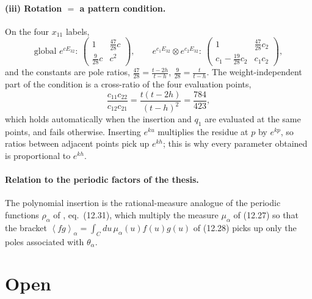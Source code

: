 \documentclass[11pt]{article}
\newcommand{\Ev}[1]{\left\langle #1 \right\rangle}
\begin{document}
\paragraph{(iii) Rotation $=$ a pattern condition.} On the four $x_{11}$ labels,
\begin{equation}
\text{global }e^{cE_{32}}:\ \begin{pmatrix}1&\frac{47}{28}c\\[2pt]\frac{9}{28}c&c^2\end{pmatrix},
\qquad
e^{c_1E_{32}}\otimes e^{c_2E_{32}}:\
\begin{pmatrix}1&\frac{47}{28}c_2\\[2pt]c_1-\frac{19}{28}c_2&c_1c_2\end{pmatrix},
\end{equation}
and the constants are pole ratios, $\frac{47}{28}=\frac{t-2h}{t-h}$, $\frac{9}{28}=\frac{t}{t-h}$.
The weight-independent part of the condition is a cross-ratio of the four evaluation points,
\begin{equation}
\frac{c_{11}c_{22}}{c_{12}c_{21}}=\frac{t(t-2h)}{(t-h)^2}=\frac{784}{423},
\end{equation}
which holds automatically when the insertion and $q_1$ are evaluated at the same points, and fails
otherwise. Inserting $e^{ku}$ multiplies the residue at $p$ by $e^{kp}$, so ratios between adjacent
points pick up $e^{kh}$; this is why every parameter obtained is proportional to $e^{kh}$.

\paragraph{Relation to the periodic factors of the thesis.} The polynomial insertion is the
rational-measure analogue of the periodic functions $\rho_\alpha$ of
\cite{RyanThesis}, eq.~(12.31), which multiply the measure $\mu_\alpha$ of (12.27) so that the
bracket $\Ev{fg}_\alpha=\int_C du\,\mu_\alpha(u)f(u)g(u)$ of (12.28) picks up only the poles
associated with $\theta_\alpha$.

\section{Open}
\end{document}
